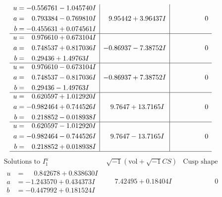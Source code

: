 \documentclass[1p]{elsarticle_modified}
\theoremstyle{definition}
\newcommand{\I}{\sqrt{-1}}
\begin{document}
$$\begin{array}{c|c|c}
\begin{aligned}
u &= -0.556761 - 1.045740 I \\
a &= \phantom{-}0.793384 - 0.769810 I \\
b &= -0.455631 + 0.074561 I\end{aligned}
 & \phantom{-}9.95442 + 3.96437 I & \phantom{-0.000000 } 0 \\ \hline\begin{aligned}
u &= \phantom{-}0.976610 + 0.673104 I \\
a &= \phantom{-}0.748537 + 0.817036 I \\
b &= \phantom{-}0.29436 + 1.49763 I\end{aligned}
 & -0.86937 - 7.38752 I & \phantom{-0.000000 } 0 \\ \hline\begin{aligned}
u &= \phantom{-}0.976610 - 0.673104 I \\
a &= \phantom{-}0.748537 - 0.817036 I \\
b &= \phantom{-}0.29436 - 1.49763 I\end{aligned}
 & -0.86937 + 7.38752 I & \phantom{-0.000000 } 0 \\ \hline\begin{aligned}
u &= \phantom{-}0.620597 + 1.012920 I \\
a &= -0.982464 + 0.744526 I \\
b &= \phantom{-}0.218852 - 0.018938 I\end{aligned}
 & \phantom{-}9.7647 + 13.7165 I & \phantom{-0.000000 } 0 \\ \hline\begin{aligned}
u &= \phantom{-}0.620597 - 1.012920 I \\
a &= -0.982464 - 0.744526 I \\
b &= \phantom{-}0.218852 + 0.018938 I\end{aligned}
 & \phantom{-}9.7647 - 13.7165 I & \phantom{-0.000000 } 0\\
 \hline 
 \end{array}$$\newpage$$\begin{array}{c|c|c}  
\text{Solutions to }I^u_{1}& \I (\text{vol} + \sqrt{-1}CS) & \text{Cusp shape}\\
 \hline 
\begin{aligned}
u &= \phantom{-}0.842678 + 0.838630 I \\
a &= -1.243570 + 0.434373 I \\
b &= -0.447992 + 0.181524 I\end{aligned}
 & \phantom{-}7.42495 + 0.18404 I & \phantom{-0.000000 } 0 \\ \hline\begin{aligned}

\end{aligned}
\end{array}$$
\end{document}
